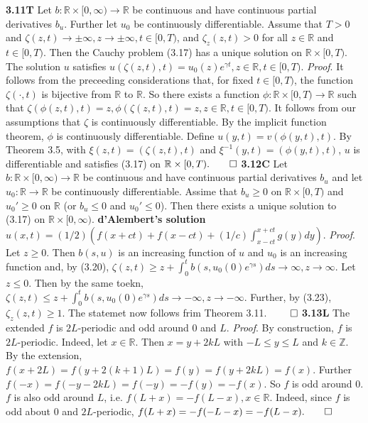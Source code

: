 \documentclass[6pt]{article}
\newcommand{\R}{\mathbb{R}}
\newcommand{\Z}{\mathbb{Z}}
\newcommand{\ra}{\rightarrow}
\begin{document}
\begin{multicols}{2}
{\bf 3.11T} Let $b: \R \times [0, \infty) \ra \R$ be continuous and have continuous partial derivatives $b_u$. Further let $u_0$ be continuously differentiable.  Assume that $T>0$ and $\zeta (z,t) \ra \pm \infty, z \ra \pm\infty, t \in [0,T)$, and $\zeta_z(z,t)>0$ for all $z \in \R$ and $t \in [0,T)$.  Then the Cauchy problem (3.17) has a unique solution on $\R \times [0, T)$. The solution $u$ satisfies $u(\zeta (z, t), t)=u_0(z)e^{\gamma t}, z \in \R, t \in [0, T)$. {\it Proof}. It follows from the preceeding considerations that, for fixed $t \in [0,T)$, the function $\zeta(\cdot, t)$ is bijective from $\R$ to $\R$. So there exists a function $\phi: \R \times [0,T) \ra \R$ such that $\zeta(\phi(z,t), t)=z, \phi(\zeta(z,t),t)=z, z \in \R, t \in [0,T)$. It follows from our assumptions that $\zeta$ is continuously differentiable.  By the implicit function theorem, $\phi$ is continuously differentiable.  Define $u(y,t)=v(\phi(y,t),t)$. By Theorem 3.5, with $\xi(z,t)=(\zeta(z,t),t)$ and $\xi^{-1}(y,t)=(\phi(y,t),t)$, $u$ is differentiable and satisfies (3.17) on $\R \times [0,T). \qed$
{\bf 3.12C} Let $b: \R \times [0, \infty) \ra \R$ be continuous and have continuous partial derivatives $b_u$ and let $u_0: \R \ra \R$ be continuously differentiable.  Assime that $b_u \geq 0$ on $\R \times [0, T)$ and $u_0' \geq 0$ on $\R$ (or $b_u \leq 0$ and $u_0' \leq 0$). Then there exists a unique solution to (3.17) on $\R \times [0, \infty)$. 
{\bf d'Alembert's solution} $u(x,t)=(1/2)(f(x+ct)+f(x-ct)+(1/c)\int_{x-ct}^{x+ct}g(y)dy)$. {\it Proof}. Let $z \geq 0$. Then $b(s,u)$ is an increasing function of $u$ and $u_0$ is an increasing function and, by (3.20), $\zeta(z,t)\geq z+\int_0^tb(s,u_0(0)e^{\gamma s})ds \ra \infty, z \ra \infty$. Let $z \leq 0$. Then by the same toekn, $\zeta(z,t)\leq z+\int_0^tb(s,u_0(0)e^{\gamma s})ds \ra -\infty, z \ra -\infty$. Further, by (3.23), $\zeta_z(z,t)\geq 1$. The statemet now follows frim Theorem 3.11. $\qed$
{\bf 3.13L} The extended $f$ is $2L$-periodic and odd around 0 and $L$. {\it Proof}. By construction, $f$ is $2L$-periodic.  Indeed, let $x \in \R$. Then $x=y+2kL$ with $-L \leq y \leq L$ and $k \in \Z$. By the extension, $f(x+2L)=f(y+2(k+1)L)=f(y)=f(y+2kL)=f(x)$. Further $f(-x)=f(-y-2kL)=f(-y)=-f(y)=-f(x)$. So $f$ is odd around 0. $f$ is also odd around $L$, i.e. $f(L+x)=-f(L-x), x \in \R$. Indeed, since $f$ is odd about 0 and $2L$-periodic, $f(L+x)=-f(-L-x)=-f(L-x). \qed$

\end{multicols}
\end{document}
